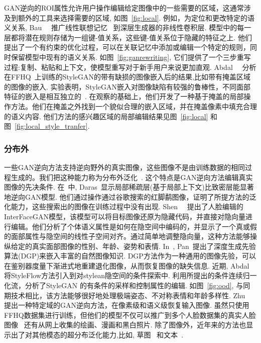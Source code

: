 GAN逆向的ROI属性允许用户操作编辑给定图像中的一些需要的区域，这通常涉及到额外的工具来选择需要的区域, 如图~\ref{fig:local}.
例如，为定位和更改特定的语义关系, Bau~\etal~\cite{bau2020rewriting} 推广线性联想记忆~\cite{kohonen1973matrix} 到深层生成器的非线性卷积层. 
模型中的每一层都将潜在规则存储为一组键-值关系，这些键-值关系位于隐藏的特征之上.
他们提出了一个有约束的优化过程，可以在关联记忆中添加或编辑一个特定的规则，同时保留模型中现有的语义关系.
如图~\ref{fig:ganrewriting}, 
它们提供了一个三步重写过程:复制、粘贴和上下文，使模型重写对于新手用户来说更加直观. 
Abdal~\etal~\cite{abdal2019image2stylegan,abdal2020image2stylegan2} 分析在FFHQ~\cite{karras2019style}上训练的StyleGAN的带有缺损的图像嵌入后的结果,比如带有掩盖区域的图像的嵌入.
实验表明，StyleGAN嵌入对图像缺陷有较强的鲁棒性，不同面部特征的嵌入是相互独立的~\cite{abdal2019image2stylegan}. 
在观察的基础上，他们开发了一种基于掩盖的局部操作方法。他们在掩盖之外找到一个貌似合理的嵌入区域，并在掩盖像素中填充合理的语义内容. 
他们方法的感兴趣区域的局部编辑结果见图~\ref{fig:local} 和图~\ref{fig:local_style_tranfer}.

\figroi

\subsubsection{分布外}
\label{sec:ood}


一些GAN逆向方法支持逆向野外的真实图像，这些图像不是由训练数据的相同过程生成的。我们把这种能力称为分布外泛化~\cite{ren2019likelihood,hendrycks2016baseline,lee2018simple}.
这个特点是GAN逆向方法编辑真实图像的先决条件.
在~\cite{daras2020your}中, Daras~\etal 显示局部稀疏层(基于局部上下文)比致密层能显著地逆向GAN模型. 
他们通过操作通过谷歌搜索的红脚鹬图像，证明了所提方法的泛化能力，这些搜索出的图像在训练过程中没有出现. 
Shen~\etal~\cite{shen2020interpreting} 提出了人脸编辑的InterFaceGAN模型，该模型可以将目标图像还原为隐藏代码，并直接对隐向量进行编辑。他们分析了个体语义属性是如何在隐空间中编码的，并显示了一个真或假的面部属性与隐空间的线性子空间对齐。通过简单地调整隐向量，这种方法能够操纵给定的真实面部图像的性别、年龄、姿势和表情.
In~\cite{pan2020exploiting}, Pan~\etal 提出了深度生成先验算法(DGP)来嵌入丰富的自然图像知识.
DGP方法作为一种通用的图像先验，可以在鉴别器度量下渐进式地重建退化图像，从而恢复图像的缺失信息.
近期, Abdal~\etal~\cite{abdal2020styleflow} 将StyleFlow方法引入到对stylean隐空间的条件探索中. 
利用所提出的条件连续归一化流，分析了StyleGAN 的有条件的采样和控制属性的编辑. 
如图~\ref{fig:ood}, 与同期技术相比，该方法能够很好地处理极端姿态、不对称表情和年龄多样性.
Zhu~\etal~\cite{zhu2020indomain} 提出一种特定域的GAN逆向方法，在像素级和语义级恢复输入图像.
虽然只使用FFHQ数据集进行训练，但他们的模型不仅可以推广到多个人脸数据集的真实人脸图像~\cite{chelnokova2014rewards, courset2018caucasian, yi2019apdrawinggan} 还有从网上收集的绘画、漫画和黑白照片.
除了图像外，近年来的方法也显示出了对其他模态的超分布泛化能力,比如, 草图~\cite{richardson2020encoding} 和文本~\cite{xia2020tedigan}.

\figood